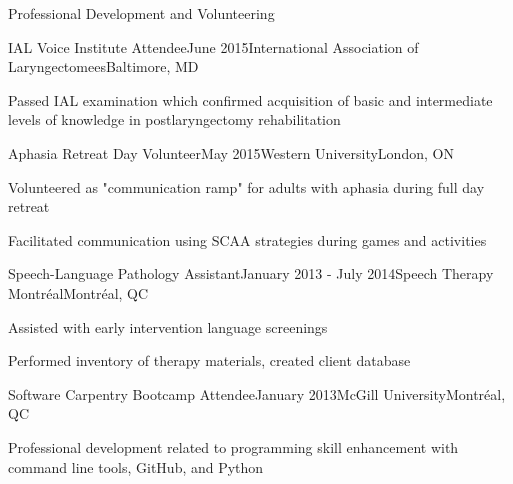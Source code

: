 \documentclass{resume} %
\begin{document}
\begin{rSection}{Professional Development and Volunteering}
	
	\begin{rSubsection}{IAL Voice Institute Attendee}{June 2015}{International Association of Laryngectomees}{Baltimore, MD}
	\item Passed IAL examination which confirmed acquisition of basic and intermediate levels of knowledge in postlaryngectomy rehabilitation
	
	\end{rSubsection}
	

	
	\begin{rSubsection}{Aphasia Retreat Day Volunteer}{May 2015}{Western University}{London, ON}
	\item Volunteered as "communication ramp" for adults with aphasia during full day retreat
	\item Facilitated communication using SCAA strategies during games and activities 
	
	\end{rSubsection}
	
	
	
	\begin{rSubsection}{Speech-Language Pathology Assistant}{January 2013 - July 2014}{Speech Therapy Montr\'eal}{Montr\'eal, QC}
	\item Assisted with early intervention language screenings
	\item Performed inventory of therapy materials, created client database
	\end{rSubsection}
	
	
	\begin{rSubsection}{Software Carpentry Bootcamp Attendee}{January 2013}{McGill University}{Montr\'eal, QC}
	\item Professional development related to programming skill enhancement with command line tools, GitHub, and Python
	\end{rSubsection}
	

\end{rSection}
\end{document}

